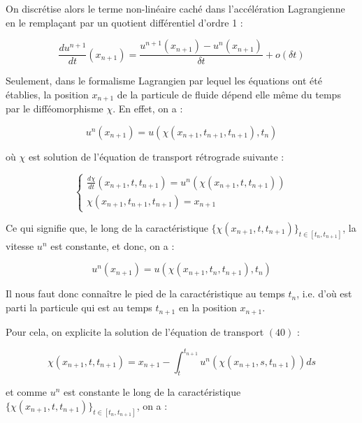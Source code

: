 \documentclass[a4paper,12pt]{article}
\begin{document}
On discrétise alors le terme non-linéaire caché dans l'accélération Lagrangienne en le remplaçant par un quotient différentiel d'ordre 1 :

\begin{equation}
\frac{du^{n+1}}{dt} (x_{n+1}) = \frac{u^{n+1} (x_{n+1}) - u^{n} (x_{n+1})}{\delta t} + o(\delta t)
\end{equation}

Seulement, dans le formalisme Lagrangien par lequel les équations ont été établies, la position $x_{n+1}$ de la particule de fluide dépend elle même du temps par le difféomorphisme $\chi$. En effet, on a :

\begin{equation}
u^n (x_{n+1}) = u \left( \chi (x_{n+1},t_{n+1},t_{n+1}), t_n \right)
\end{equation}

où $\chi$ est solution de l'équation de transport rétrograde suivante :

\begin{equation}
\left \{
\begin{split}
\frac{d \chi}{dt} (x_{n+1},t,t_{n+1}) = u^n \left( \chi (x_{n+1},t,t_{n+1}) \right) \\
\chi (x_{n+1},t_{n+1},t_{n+1}) = x_{n+1}
\end{split}
\right.
\end{equation}

Ce qui signifie que, le long de la caractéristique $\{ \chi (x_{n+1},t,t_{n+1}) \}_{t \in [t_n,t_{n+1}]}$, la vitesse $u^n$ est constante, et donc, on a :

\begin{equation}
u^n (x_{n+1}) = u \left( \chi (x_{n+1},t_n,t_{n+1}) , t_n \right)
\end{equation}

Il nous faut donc connaître le pied de la caractéristique au temps $t_n$, i.e. d'où est parti la particule qui est au temps $t_{n+1}$ en la position $x_{n+1}$.

Pour cela, on explicite la solution de l'équation de transport $(40)$ :

\begin{equation}
\chi (x_{n+1},t,t_{n+1}) = x_{n+1} - \int_{t}^{t_{n+1}} u^n \left( \chi (x_{n+1},s,t_{n+1}) \right) ds
\end{equation}

et comme $u^n$ est constante le long de la caractéristique $\{ \chi (x_{n+1},t,t_{n+1}) \}_{t \in [t_n,t_{n+1}]}$, on a :
\end{document}
